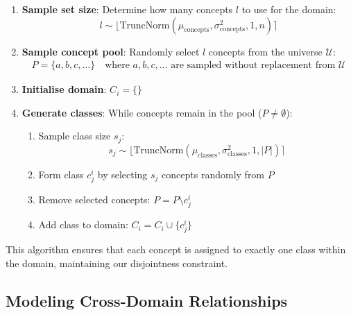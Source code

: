 \begin{enumerate}
    \item \textbf{Sample set size}: Determine how many concepts $l$ to use for the domain:
          \begin{equation*}
              l \sim \lfloor\text{TruncNorm}(\mu_{\text{concepts}}, \sigma^2_{\text{concepts}}, 1, n)\rceil
          \end{equation*}

    \item \textbf{Sample concept pool}: Randomly select $l$ concepts from the universe $\mathcal{U}$:
          \begin{align*}
              P = \{a, b, c, \ldots\} \quad \text{where } a, b, c, \ldots \text{ are sampled without replacement from } \mathcal{U}
          \end{align*}

    \item \textbf{Initialise domain}: $C_i = \{\}$

    \item \textbf{Generate classes}: While concepts remain in the pool ($P \neq \emptyset$):
          \begin{enumerate}
              \item Sample class size $s_j$:
                    \begin{equation*}
                        s_j \sim \lfloor\text{TruncNorm}(\mu_{\text{classes}}, \sigma^2_{\text{classes}}, 1, |P|)\rceil
                    \end{equation*}

              \item Form class $c^i_j$ by selecting $s_j$ concepts randomly from $P$

              \item Remove selected concepts: $P = P \setminus c_j^i$

              \item Add class to domain: $C_i = C_i \cup \{c^i_j\}$
          \end{enumerate}
\end{enumerate}

This algorithm ensures that each concept is assigned to exactly one class within the domain, maintaining our disjointness constraint.

\subsection{Modeling Cross-Domain Relationships}

